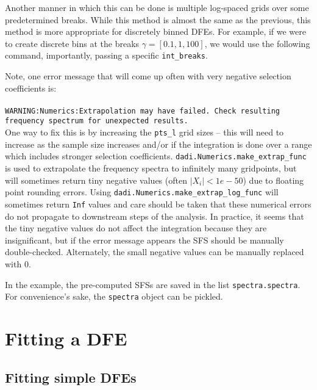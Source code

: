 \documentclass[11pt]{article}
\begin{document}


Another manner in which this can be done is multiple log-spaced grids over some predetermined breaks. While this method is almost the same as the previous, this method is more appropriate for discretely binned DFEs. For example, if we were to create discrete bins at the breaks $\gamma=[0.1, 1, 100]$, we would use the following command, importantly, passing a specific \texttt{int\_breaks}.



Note, one error message that will come up often with very negative selection coefficients is: \\ \\
\texttt{WARNING:Numerics:Extrapolation may have failed. Check resulting frequency spectrum for unexpected results.} \\

One way to fix this is by increasing the \texttt{pts\_l} grid sizes -- this will need to increase as the sample size increases and/or if the integration is done over a range which includes stronger selection coefficients. \texttt{dadi.Numerics.make\_extrap\_func} is used to extrapolate the frequency spectra to infinitely many gridpoints, but will sometimes return tiny negative values (often $|X_i|<1e-50$) due to floating point rounding errors. Using \texttt{dadi.Numerics.make\_extrap\_log\_func} will sometimes return \texttt{Inf} values and care should be taken that these numerical errors do not propagate to downstream steps of the analysis. In practice, it seems that the tiny negative values do not affect the integration because they are insignificant, but if the error message appears the SFS should be manually double-checked. Alternately, the small negative values can be manually replaced with 0. 

In the example, the pre-computed SFSs are saved in the list \texttt{spectra.spectra}. For convenience's sake, the \texttt{spectra} object can be pickled.



\section{Fitting a DFE}

\subsection{Fitting simple DFEs}
\end{document}

